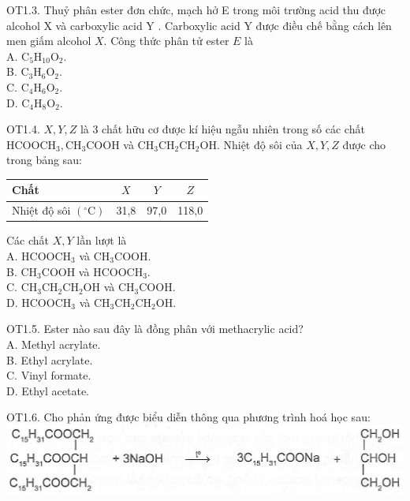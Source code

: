 \documentclass[10pt]{article}
\begin{document}
OT1.3. Thuỷ phân ester đơn chức, mạch hở E trong môi trường acid thu được alcohol X và carboxylic acid Y . Carboxylic acid Y được điều chế bằng cách lên men giấm alcohol $X$. Công thức phân tử ester $E$ là\\
A. $\mathrm{C}_{5} \mathrm{H}_{10} \mathrm{O}_{2}$.\\
B. $\mathrm{C}_{3} \mathrm{H}_{6} \mathrm{O}_{2}$.\\
C. $\mathrm{C}_{4} \mathrm{H}_{6} \mathrm{O}_{2}$.\\
D. $\mathrm{C}_{4} \mathrm{H}_{8} \mathrm{O}_{2}$.

OT1.4. $X, Y, Z$ là 3 chất hữu cơ được kí hiệu ngẫu nhiên trong số các chất $\mathrm{HCOOCH}_{3}, \mathrm{CH}_{3} \mathrm{COOH}$ và $\mathrm{CH}_{3} \mathrm{CH}_{2} \mathrm{CH}_{2} \mathrm{OH}$. Nhiệt độ sôi của $X, Y, Z$ được cho trong bảng sau:

\begin{center}
\begin{tabular}{|l|c|c|c|}
\hline
Chất & $X$ & $Y$ & $Z$ \\
\hline
Nhiệt độ sôi $\left({ }^{\circ} \mathrm{C}\right)$ & 31,8 & 97,0 & 118,0 \\
\hline
\end{tabular}
\end{center}

Các chất $X, Y$ lần lượt là\\
A. $\mathrm{HCOOCH}_{3}$ và $\mathrm{CH}_{3} \mathrm{COOH}$.\\
B. $\mathrm{CH}_{3} \mathrm{COOH}$ và $\mathrm{HCOOCH}_{3}$.\\
C. $\mathrm{CH}_{3} \mathrm{CH}_{2} \mathrm{CH}_{2} \mathrm{OH}$ và $\mathrm{CH}_{3} \mathrm{COOH}$.\\
D. $\mathrm{HCOOCH}_{3}$ và $\mathrm{CH}_{3} \mathrm{CH}_{2} \mathrm{CH}_{2} \mathrm{OH}$.

OT1.5. Ester nào sau đây là đồng phân với methacrylic acid?\\
A. Methyl acrylate.\\
B. Ethyl acrylate.\\
C. Vinyl formate.\\
D. Ethyl acetate.

OT1.6. Cho phản ứng được biểu diễn thông qua phương trình hoá học sau:\\
\includegraphics[max width=\textwidth, center]{2025_10_23_de6f5713836e4e91b3c8g-013}
\end{document}
